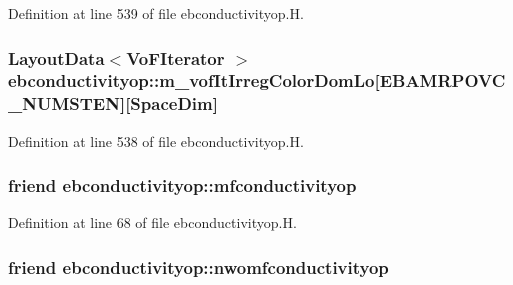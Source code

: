 Definition at line 539 of file ebconductivityop.\+H.

\subsubsection[{\texorpdfstring{m\+\_\+vof\+It\+Irreg\+Color\+Dom\+Lo}{m_vofItIrregColorDomLo}}]{\setlength{\rightskip}{0pt plus 5cm}Layout\+Data$<$Vo\+F\+Iterator $>$ ebconductivityop\+::m\+\_\+vof\+It\+Irreg\+Color\+Dom\+Lo\mbox{[}E\+B\+A\+M\+R\+P\+O\+V\+C\+\_\+\+N\+U\+M\+S\+T\+EN\mbox{]}\mbox{[}Space\+Dim\mbox{]}\hspace{0.3cm}{\ttfamily [protected]}}\hypertarget{classebconductivityop_a581d21ebd1ed696c774bfdaf64d07d2f}{}\label{classebconductivityop_a581d21ebd1ed696c774bfdaf64d07d2f}


Definition at line 538 of file ebconductivityop.\+H.

\subsubsection[{\texorpdfstring{mfconductivityop}{mfconductivityop}}]{\setlength{\rightskip}{0pt plus 5cm}friend ebconductivityop\+::mfconductivityop\hspace{0.3cm}{\ttfamily [private]}}\hypertarget{classebconductivityop_a75193f34564781bf8ea69fe3b4953c9b}{}\label{classebconductivityop_a75193f34564781bf8ea69fe3b4953c9b}


Definition at line 68 of file ebconductivityop.\+H.

\subsubsection[{\texorpdfstring{nwomfconductivityop}{nwomfconductivityop}}]{\setlength{\rightskip}{0pt plus 5cm}friend ebconductivityop\+::nwomfconductivityop\hspace{0.3cm}{\ttfamily [private]}}\hypertarget{classebconductivityop_a07aef0f47985289f2d36dfc68093776b}{}\label{classebconductivityop_a07aef0f47985289f2d36dfc68093776b}


